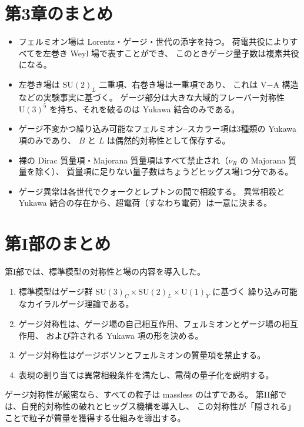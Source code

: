 \documentclass[uplatex,dvipdfmx,a4paper,11pt,openany]{jsbook}
\numberwithin{equation}{chapter}
\theoremstyle{definition}
\theoremstyle{plain}
\theoremstyle{remark}
\newcommand{\SU}{\mathrm{SU}}
\newcommand{\U}{\mathrm{U}}
\begin{document}
\section*{第3章のまとめ}
\begin{itemize}
    \item フェルミオン場は Lorentz・ゲージ・世代の添字を持つ。
    荷電共役によりすべてを左巻き Weyl 場で表すことができ、
    このときゲージ量子数は複素共役になる。
    \item 左巻き場は $\SU(2)_L$ 二重項、右巻き場は一重項であり、
    これは V$-$A 構造などの実験事実に基づく。
    ゲージ部分は大きな大域的フレーバー対称性 $\U(3)^5$ を持ち、それを破るのは Yukawa 結合のみである。
    \item ゲージ不変かつ繰り込み可能なフェルミオン--スカラー項は3種類の Yukawa 項のみであり、
    $B$ と $L$ は偶然的対称性として保存する。
    \item 裸の Dirac 質量項・Majorana 質量項はすべて禁止され（$\nu_R$ の Majorana 質量を除く）、
    質量項に足りない量子数はちょうどヒッグス場1つ分である。
    \item ゲージ異常は各世代でクォークとレプトンの間で相殺する。
    異常相殺と Yukawa 結合の存在から、超電荷（すなわち電荷）は一意に決まる。
\end{itemize}
\section*{第I部のまとめ}
第I部では、標準模型の対称性と場の内容を導入した。
\begin{enumerate}
    \item 標準模型はゲージ群 $\SU(3)_C\times\SU(2)_L\times\U(1)_Y$ に基づく
    繰り込み可能なカイラルゲージ理論である。
    \item ゲージ対称性は、ゲージ場の自己相互作用、フェルミオンとゲージ場の相互作用、
    および許される Yukawa 項の形を決める。
    \item ゲージ対称性はゲージボソンとフェルミオンの質量項を禁止する。
    \item 表現の割り当ては異常相殺条件を満たし、電荷の量子化を説明する。
\end{enumerate}
ゲージ対称性が厳密なら、すべての粒子は massless のはずである。
第II部では、自発的対称性の破れとヒッグス機構を導入し、
この対称性が「隠される」ことで粒子が質量を獲得する仕組みを導出する。
\end{document}
